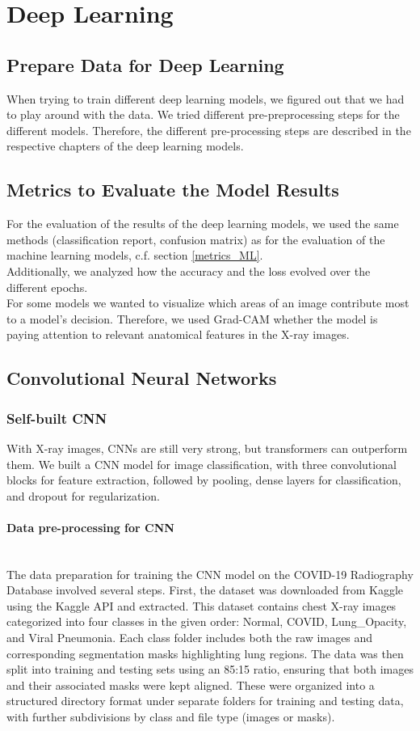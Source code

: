 \documentclass{article}
\begin{document}
\section{Deep Learning}

\subsection{Prepare Data for Deep Learning}
When trying to train different deep learning models, we figured out that we had to play around with the data. We tried different pre-preprocessing steps for the different models. Therefore, the different pre-processing steps are described in the respective chapters of the deep learning models.

\subsection{Metrics to Evaluate the Model Results}
For the evaluation of the results of the deep learning models, we used the same methods (classification report, confusion matrix) as for the evaluation of the machine learning models, c.f. section \ref{metrics_ML}. \\
Additionally, we analyzed how the accuracy and the loss evolved over the different epochs. \\
For some models we wanted to visualize which areas of an image contribute most to a model's decision. Therefore, we used Grad-CAM whether the model is paying attention to relevant anatomical features in the X-ray images.
\subsection{Convolutional Neural Networks}
\subsubsection{Self-built CNN}
With X-ray images, CNNs are still very strong, but transformers can outperform them.
We built a CNN model for image classification, with three convolutional blocks for feature extraction, followed by pooling, dense layers for classification, and dropout for regularization.
\paragraph{Data pre-processing for CNN}\mbox{}\\
The data preparation for training the CNN model on the COVID-19 Radiography Database involved several steps. First, the dataset was downloaded from Kaggle using the Kaggle API and extracted. This dataset contains chest X-ray images categorized into four classes in the given order: Normal, COVID, Lung\_Opacity, and Viral Pneumonia. Each class folder includes both the raw images and corresponding segmentation masks highlighting lung regions. The data was then split into training and testing sets using an 85:15 ratio, ensuring that both images and their associated masks were kept aligned. These were organized into a structured directory format under separate folders for training and testing data, with further subdivisions by class and file type (images or masks).
\end{document}
